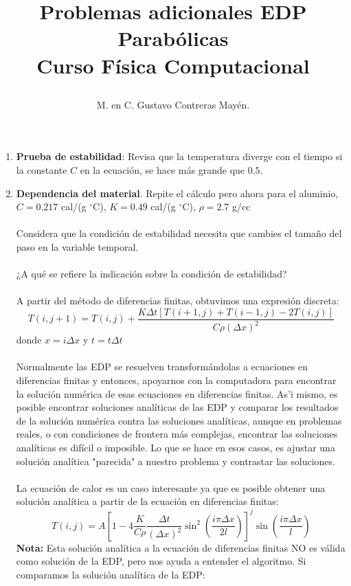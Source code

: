 \documentclass[12pt]{article}
\author{M. en C. Gustavo Contreras Mayén.}
\title{\begin{center}
Problemas adicionales EDP Parabólicas \\ Curso Física Computacional
\end{center}}
\date{ }
\begin{document}
\maketitle
\fontsize{13}{13}\selectfont
\begin{enumerate}
\item \textbf{Prueba de estabilidad}: Revisa que la temperatura diverge con el tiempo si la constante $C$ en la ecuaci\'{o}n, se hace m\'{a}s grande que $0.5$.
\item \textbf{Dependencia del material}. Repite el c\'{a}lculo pero ahora para el aluminio, $C=0.217$ cal/(g ${}^{\circ}$C), $K=0.49$ cal/(g ${}^{\circ}$C), $\rho = 2.7$ g/cc 
\\ 
\\
Considera que la condici\'{o}n de estabilidad necesita que cambies el tamaño del paso en la variable temporal.
\\
\\
¿A qué se refiere la indicaci\'{o}n sobre la condici\'{o}n de estabilidad?
\\
\\
A partir del m\'{e}todo de diferencias finitas, obtuvimos una expresi\'{o}n discreta:
\[ T(i,j+1)=T(i,j) + \dfrac{K \Delta t [T(i+1,j) + T(i-1,j) - 2T(i,j)]}{C \rho (\Delta x)^{2}} \]
donde $x = i \Delta x$ y $ t= t \Delta t$
\\
\\
Normalmente las EDP se resuelven transform\'{a}ndolas a ecuaciones en diferencias finitas y entonces, apoyarnos con la computadora para encontrar la soluci\'{o}n num\'{e}rica de esas ecuaciones en diferencias finitas. As'{i} mismo, es posible encontrar soluciones anal\'{i}ticas de las EDP y comparar los resultados de la soluci\'{o}n num\'{e}rica contra las soluciones anal\'{i}ticas, aunque en problemas reales, o con condiciones de frontera m\'{a}s complejas, encontrar las soluciones anal\'{i}ticas es dif\'{i}cil o imposible. Lo que se hace en esos casos, es ajustar una solución anal\'{i}tica "parecida" a nuestro problema y contrastar las soluciones.
\\
\\
La ecuaci\'{o}n de calor es un caso interesante ya que es posible obtener una solución anal\'{i}tica a partir de la ecuaci\'{o}n en diferencias finitas:
\[  T(i,j) = A \left[  1 - 4 \dfrac{K}{C \rho} \dfrac{\Delta t}{(\Delta x)^{2}}  \sin^{2} \left( \dfrac{i \pi \Delta x}{2l} \right) \right]^{j} \sin \left( \dfrac{i \pi \Delta x}{l} \right) \]
\textbf{Nota: } Esta solución anal\'{i}tica a la ecuaci\'{o}n de diferencias finitas NO es v\'{a}lida como soluci\'{o}n de la EDP, pero nos ayuda a entender el algoritmo. Si comparamos la soluci\'{o}n anal\'{i}tica de la EDP:

\end{enumerate}
\end{document}
